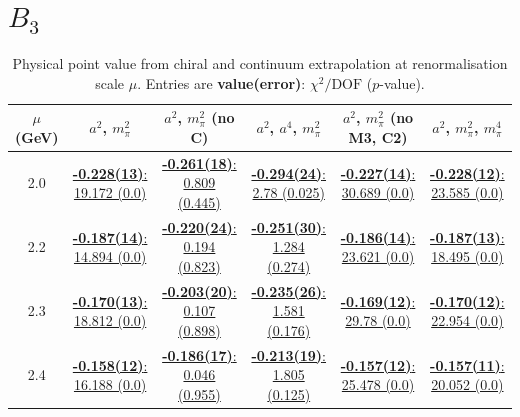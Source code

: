 \documentclass[12pt]{extarticle}
\begin{document}
\section{$B_3$}
\begin{table}[h!]
\begin{center}
\begin{tabular}{|c|c|c|c|c|c|}
\hline
$\mu$ (GeV) & $a^2$, $m_\pi^2$& $a^2$, $m_\pi^2$ (no C)& $a^2$, $a^4$, $m_\pi^2$& $a^2$, $m_\pi^2$ (no M3, C2)& $a^2$, $m_\pi^2$, $m_\pi^4$\\
\hline
2.0& \hyperlink{SSmPP/SUSY/a2m2_20.pdf.1}{\textbf{-0.228(13)}: 19.172 (0.0)} & \hyperlink{SSmPP/SUSY/a2m2noC_20.pdf.1}{\textbf{-0.261(18)}: 0.809 (0.445)} & \hyperlink{SSmPP/SUSY/a2a4m2_20.pdf.1}{\textbf{-0.294(24)}: 2.78 (0.025)} & \hyperlink{SSmPP/SUSY/a2m2mcut_20.pdf.1}{\textbf{-0.227(14)}: 30.689 (0.0)} & \hyperlink{SSmPP/SUSY/a2m2m4_20.pdf.1}{\textbf{-0.228(12)}: 23.585 (0.0)}\\
2.2& \hyperlink{SSmPP/SUSY/a2m2_22.pdf.1}{\textbf{-0.187(14)}: 14.894 (0.0)} & \hyperlink{SSmPP/SUSY/a2m2noC_22.pdf.1}{\textbf{-0.220(24)}: 0.194 (0.823)} & \hyperlink{SSmPP/SUSY/a2a4m2_22.pdf.1}{\textbf{-0.251(30)}: 1.284 (0.274)} & \hyperlink{SSmPP/SUSY/a2m2mcut_22.pdf.1}{\textbf{-0.186(14)}: 23.621 (0.0)} & \hyperlink{SSmPP/SUSY/a2m2m4_22.pdf.1}{\textbf{-0.187(13)}: 18.495 (0.0)}\\
2.3& \hyperlink{SSmPP/SUSY/a2m2_23.pdf.1}{\textbf{-0.170(13)}: 18.812 (0.0)} & \hyperlink{SSmPP/SUSY/a2m2noC_23.pdf.1}{\textbf{-0.203(20)}: 0.107 (0.898)} & \hyperlink{SSmPP/SUSY/a2a4m2_23.pdf.1}{\textbf{-0.235(26)}: 1.581 (0.176)} & \hyperlink{SSmPP/SUSY/a2m2mcut_23.pdf.1}{\textbf{-0.169(12)}: 29.78 (0.0)} & \hyperlink{SSmPP/SUSY/a2m2m4_23.pdf.1}{\textbf{-0.170(12)}: 22.954 (0.0)}\\
2.4& \hyperlink{SSmPP/SUSY/a2m2_24.pdf.1}{\textbf{-0.158(12)}: 16.188 (0.0)} & \hyperlink{SSmPP/SUSY/a2m2noC_24.pdf.1}{\textbf{-0.186(17)}: 0.046 (0.955)} & \hyperlink{SSmPP/SUSY/a2a4m2_24.pdf.1}{\textbf{-0.213(19)}: 1.805 (0.125)} & \hyperlink{SSmPP/SUSY/a2m2mcut_24.pdf.1}{\textbf{-0.157(12)}: 25.478 (0.0)} & \hyperlink{SSmPP/SUSY/a2m2m4_24.pdf.1}{\textbf{-0.157(11)}: 20.052 (0.0)}\\
\hline
\end{tabular}
\caption{Physical point value from chiral and continuum extrapolation at renormalisation scale $\mu$. Entries are \textbf{value(error)}: $\chi^2/\text{DOF}$ ($p$-value).}
\end{center}
\end{table}
\end{document}
